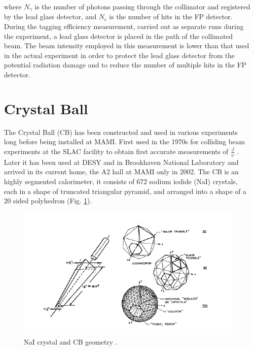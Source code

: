 \indent where $N_{\gamma}$ is the number of photons passing through the collimator and registered by the lead glass detector, and $N_{e}$ is the number of hits in the FP detector. During the tagging efficiency measurement, carried out as separate runs during the experiment, a lead glass detector is placed in the path of the collimated beam. The beam intensity employed in this measurement is lower than that used in the actual experiment in order to protect the lead glass detector from the potential radiation damage and to reduce the number of multiple hits in the FP detector.

\section{Crystal Ball}

\indent The Crystal Ball (CB) has been constructed and used in various experiments long before  being  installed  at  MAMI.  First  used  in the 1970s  for colliding  beam experiments at the SLAC facility to obtain first accurate measurements of $\frac{J}{\psi}$ \cite {oreglia}. Later it has been used at DESY and in Brookhaven National Laboratory and arrived in its current home, the A2 hall at MAMI only in 2002. The CB is an highly segmented calorimeter, it consists of 672 sodium iodide (NaI) crystals, each in a shape of truncated triangular pyramid, and arranged into a shape of a 20 sided polyhedron (Fig. \ref{naigeom}).

\begin{figure}[H]
\begin{center}
\includegraphics[scale=0.7]{pictures/png/naigeom.png}
\caption{NaI crystal and CB geometry \cite{a2mami}.}
\label{naigeom}
\end{center}
\end{figure}

